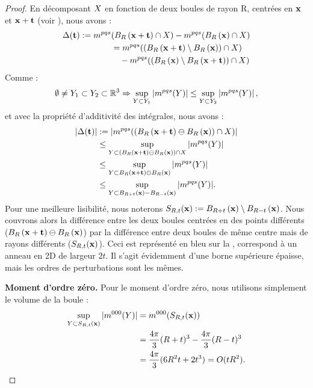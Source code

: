 \begin{proof}
En décomposant $X$ en fonction de deux boules de rayon R, centrées en $\mathbf{x}$
et $\mathbf{x} + \mathbf{t}$ (voir ), nous avons :
%
\begin{align}
  \Delta(\mathbf{t}) := m^{pqs}&(B_{R}\left(\mathbf{x}+\mathbf{t}\right) \cap X ) - m^{pqs}(B_{R}\left(\mathbf{x}\right) \cap X ) \\
    &= m^{pqs}( (B_{R}\left(\mathbf{x}+\mathbf{t}\right) \setminus B_{R}\left(\mathbf{x}\right)) \cap X ) \\
    & \quad - m^{pqs}( (B_{R}\left(\mathbf{x}\right) \setminus B_{R}\left(\mathbf{x}+\mathbf{t}\right)) \cap X )
\end{align}
%
Comme :
%
\begin{equation}
  \emptyset \neq Y_1 \subset Y_2 \subset \mathbb{R}^3 \Rightarrow \sup_{ Y \subset Y_1} \left | m^{pqs}(Y) \right| \le \sup_{Y \subset Y_2} \left| m^{pqs}(Y)\right |,
\end{equation}
%
et avec la propriété d'additivité des intégrales, nous avons :
%
\begin{align}
  |\Delta(\mathbf{t})| &:= |m^{pqs}( (B_{R}\left(\mathbf{x}+\mathbf{t}\right) \ominus B_{R}\left(\mathbf{x}\right)) \cap X )| \\
  &\le \sup_{Y \subset (B_{R}\left(\mathbf{x}+\mathbf{t}\right) \ominus B_{R}\left(\mathbf{x}\right)) \cap X} |m^{pqs}(Y)|\\
  &\le \sup_{Y \subset B_{R}\left(\mathbf{x}+\mathbf{t}\right) \ominus B_{R}\left(\mathbf{x}\right)} |m^{pqs}(Y)|\\
  &\le \sup_{Y \subset B_{R+t}\left(\mathbf{x}\right) - B_{R-t}\left(\mathbf{x}\right)} |m^{pqs}(Y)|.
\end{align}
%
Pour une meilleure lisibilité, nous noterons $S_{R,t}(\mathbf{x}) :=
B_{R+t}\left(\mathbf{x}\right) \setminus B_{R-t}\left(\mathbf{x}\right)$. Nous couvrons alors la différence
entre les deux boules centrées en des points différents ($B_{R}\left(\mathbf{x}+\mathbf{t}\right)
\ominus B_{R}\left(\mathbf{x}\right)$) par la différence entre deux boules de même centre mais
de rayons différents ($S_{R,t}(\mathbf{x})$). Ceci est représenté
en bleu sur la , correspond à un anneau en 2D de
largeur $2t$. Il s'agit évidemment d'une borne supérieure épaisse, mais les
ordres de perturbations sont les mêmes.


\noindent\textbf{Moment d'ordre zéro.\quad}
%
Pour le moment d'ordre zéro, nous utilisons simplement le volume de la boule :
%
\begin{align}
  \sup_{Y \subset S_{R,t}(\mathbf{x})} |m^{000}(Y)|
  &= m^{000}( S_{R,t}(\mathbf{x}) ) \\
  &= \frac{4\pi}{3}(R+t)^3 - \frac{4\pi}{3}(R-t)^3 \\
  &= \frac{4\pi}{3}(6R^2t+2t^3)=O(tR^2).
\end{align}



\end{proof}
